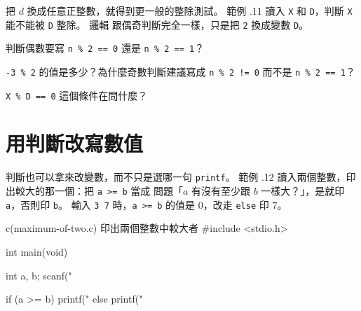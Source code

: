 
把 $d$ 換成任意正整數，就得到更一般的整除測試。 範例 \thechapter.11 讀入
\texttt{X} 和 \texttt{D}，判斷 \texttt{X} 能不能被 \texttt{D} 整除。 邏輯
跟偶奇判斷完全一樣，只是把 \texttt{2} 換成變數 \texttt{D}。




\begin{drills}[label=drills:cond-modulo]
\item 判斷偶數要寫 \texttt{n \% 2 == 0} 還是 \texttt{n \% 2 == 1}？
\item \texttt{-3 \% 2} 的值是多少？為什麼奇數判斷建議寫成
\texttt{n \% 2 != 0} 而不是 \texttt{n \% 2 == 1}？
\item \texttt{X \% D == 0} 這個條件在問什麼？
\end{drills}

\section{用判斷改寫數值}
\label{sec:cond-rewrite-values}

判斷也可以拿來改變數，而不只是選哪一句 \texttt{printf}。 範例
\thechapter.12 讀入兩個整數，印出較大的那一個：把 \texttt{a >= b} 當成
問題「$a$ 有沒有至少跟 $b$ 一樣大？」，是就印 \texttt{a}，否則印
\texttt{b}。 輸入 \texttt{3 7} 時，\texttt{a >= b} 的值是 $0$，改走
\texttt{else} 印 $7$。

\begin{example}{c}{(maximum-of-two.c) 印出兩個整數中較大者}
#include <stdio.h>

int main(void) {
    int a, b;
    scanf("%

    if (a >= b) {
        printf("%
    } else {
        printf("%
    }
}
\end{example}

